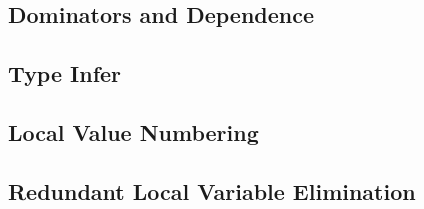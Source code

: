 \subsection{Dominators and Dependence}

\subsection{Type Infer}

\subsection{Local Value Numbering}

\subsection{Redundant Local Variable Elimination}